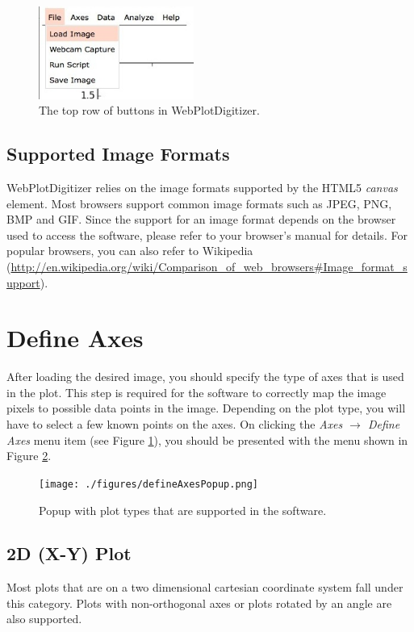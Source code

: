 \documentclass[letterpaper, 10pt]{article}
\begin{document}
\begin{figure}
\begin{center}
\includegraphics[width=2in]{./figures/fileMenu.jpg}
\caption{The top row of buttons in WebPlotDigitizer.}
\label{fig:topButtons}
\end{center}
\end{figure}

\subsection{Supported Image Formats}
WebPlotDigitizer relies on the image formats supported by the HTML5 \emph{canvas} element. Most browsers support common image formats such as JPEG, PNG, BMP and GIF. Since the support for an image format depends on the browser used to access the software, please refer to your browser's manual for details. For popular browsers, you can also refer to Wikipedia (\url{http://en.wikipedia.org/wiki/Comparison_of_web_browsers#Image_format_support}).


\section{Define Axes}

After loading the desired image, you should specify the type of axes that is used in the plot. This step is required for the software to correctly map the image pixels to possible data points in the image. Depending on the plot type, you will have to select a few known points on the axes. On clicking the \emph{Axes $\rightarrow$ Define Axes} menu item (see Figure \ref{fig:topButtons}), you should be presented with the menu shown in Figure \ref{fig:defineAxesPopup}.
\begin{figure}
\begin{center}
\texttt{[image: ./figures/defineAxesPopup.png]}
\caption{Popup with plot types that are supported in the software.}
\label{fig:defineAxesPopup}
\end{center}
\end{figure}

\subsection{2D (X-Y) Plot}
Most plots that are on a two dimensional cartesian coordinate system fall under this category. Plots with non-orthogonal axes or plots rotated by an angle are also supported.
\end{document}
